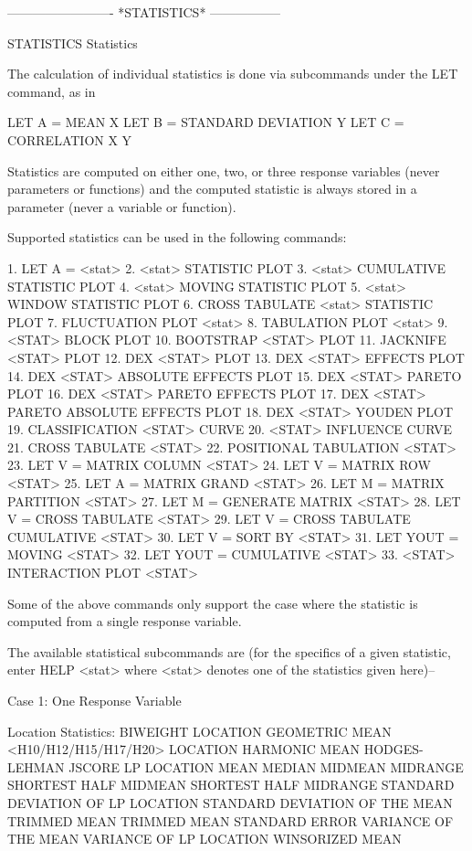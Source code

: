  
 
 


-------------------------  *STATISTICS*  -----------------
 
STATISTICS
Statistics
 
The calculation of individual statistics is done via subcommands under
the LET command, as in
 
   LET A = MEAN X
   LET B = STANDARD DEVIATION Y
   LET C = CORRELATION X Y
 
Statistics are computed on either one, two, or three response variables
(never parameters or functions) and the computed statistic is always
stored in a parameter (never a variable or function).

Supported statistics can be used in the following commands:

   1. LET A = <stat>
   2. <stat> STATISTIC PLOT
   3. <stat> CUMULATIVE STATISTIC PLOT
   4. <stat> MOVING STATISTIC PLOT
   5. <stat> WINDOW STATISTIC PLOT
   6. CROSS TABULATE <stat> STATISTIC PLOT
   7. FLUCTUATION PLOT <stat>
   8. TABULATION PLOT <stat>
   9. <STAT> BLOCK PLOT
  10. BOOTSTRAP <STAT> PLOT
  11. JACKNIFE <STAT> PLOT
  12. DEX <STAT> PLOT
  13. DEX <STAT> EFFECTS PLOT
  14. DEX <STAT> ABSOLUTE EFFECTS PLOT
  15. DEX <STAT> PARETO PLOT
  16. DEX <STAT> PARETO EFFECTS PLOT
  17. DEX <STAT> PARETO ABSOLUTE EFFECTS PLOT
  18. DEX <STAT> YOUDEN PLOT
  19. CLASSIFICATION <STAT> CURVE
  20. <STAT> INFLUENCE CURVE
  21. CROSS TABULATE <STAT>
  22. POSITIONAL TABULATION <STAT>
  23. LET V = MATRIX COLUMN <STAT>
  24. LET V = MATRIX ROW <STAT>
  25. LET A = MATRIX GRAND <STAT>
  26. LET M = MATRIX PARTITION <STAT>
  27. LET M = GENERATE MATRIX <STAT>
  28. LET V = CROSS TABULATE <STAT>
  29. LET V = CROSS TABULATE CUMULATIVE <STAT>
  30. LET V = SORT BY <STAT>
  31. LET YOUT = MOVING <STAT>
  32. LET YOUT = CUMULATIVE <STAT>
  33. <STAT> INTERACTION PLOT <STAT>

Some of the above commands only support the case where the
statistic is computed from a single response variable.

The available statistical subcommands are (for the specifics of a
given statistic, enter HELP <stat> where <stat> denotes one of the
statistics given here)--
 
Case 1: One Response Variable

Location Statistics:
   BIWEIGHT LOCATION
   GEOMETRIC MEAN
   <H10/H12/H15/H17/H20> LOCATION
   HARMONIC MEAN
   HODGES-LEHMAN
   JSCORE
   LP LOCATION
   MEAN
   MEDIAN
   MIDMEAN
   MIDRANGE
   SHORTEST HALF MIDMEAN
   SHORTEST HALF MIDRANGE
   STANDARD DEVIATION OF LP LOCATION
   STANDARD DEVIATION OF THE MEAN
   TRIMMED MEAN
   TRIMMED MEAN STANDARD ERROR
   VARIANCE OF THE MEAN
   VARIANCE OF LP LOCATION
   WINSORIZED MEAN

